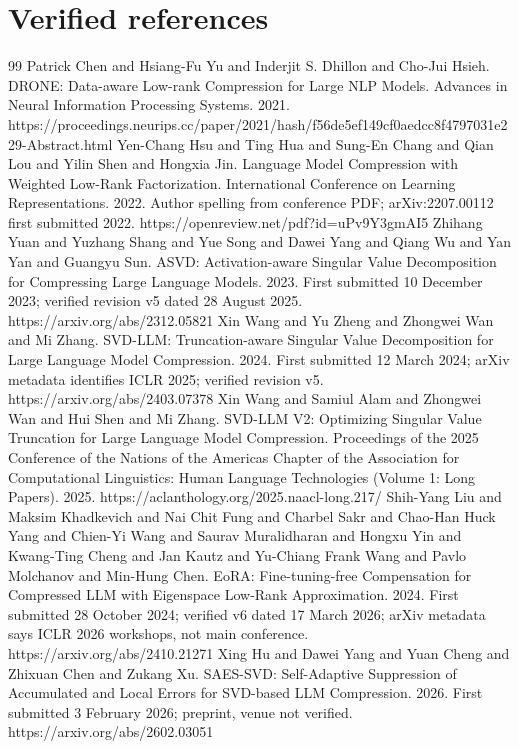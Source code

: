 \documentclass[10pt]{article}
\begin{document}
\section{Verified references}
\begin{thebibliography}{99}
 Patrick Chen and Hsiang-Fu Yu and Inderjit S. Dhillon and Cho-Jui Hsieh. DRONE: Data-aware Low-rank Compression for Large NLP Models. Advances in Neural Information Processing Systems. 2021. https://proceedings.neurips.cc/paper/2021/hash/f56de5ef149cf0aedcc8f4797031e229-Abstract.html
 Yen-Chang Hsu and Ting Hua and Sung-En Chang and Qian Lou and Yilin Shen and Hongxia Jin. Language Model Compression with Weighted Low-Rank Factorization. International Conference on Learning Representations. 2022. Author spelling from conference PDF; arXiv:2207.00112 first submitted 2022. https://openreview.net/pdf?id=uPv9Y3gmAI5
 Zhihang Yuan and Yuzhang Shang and Yue Song and Dawei Yang and Qiang Wu and Yan Yan and Guangyu Sun. ASVD: Activation-aware Singular Value Decomposition for Compressing Large Language Models. 2023. First submitted 10 December 2023; verified revision v5 dated 28 August 2025. https://arxiv.org/abs/2312.05821
 Xin Wang and Yu Zheng and Zhongwei Wan and Mi Zhang. SVD-LLM: Truncation-aware Singular Value Decomposition for Large Language Model Compression. 2024. First submitted 12 March 2024; arXiv metadata identifies ICLR 2025; verified revision v5. https://arxiv.org/abs/2403.07378
 Xin Wang and Samiul Alam and Zhongwei Wan and Hui Shen and Mi Zhang. SVD-LLM V2: Optimizing Singular Value Truncation for Large Language Model Compression. Proceedings of the 2025 Conference of the Nations of the Americas Chapter of the Association for Computational Linguistics: Human Language Technologies (Volume 1: Long Papers). 2025. https://aclanthology.org/2025.naacl-long.217/
 Shih-Yang Liu and Maksim Khadkevich and Nai Chit Fung and Charbel Sakr and Chao-Han Huck Yang and Chien-Yi Wang and Saurav Muralidharan and Hongxu Yin and Kwang-Ting Cheng and Jan Kautz and Yu-Chiang Frank Wang and Pavlo Molchanov and Min-Hung Chen. EoRA: Fine-tuning-free Compensation for Compressed LLM with Eigenspace Low-Rank Approximation. 2024. First submitted 28 October 2024; verified v6 dated 17 March 2026; arXiv metadata says ICLR 2026 workshops, not main conference. https://arxiv.org/abs/2410.21271
 Xing Hu and Dawei Yang and Yuan Cheng and Zhixuan Chen and Zukang Xu. SAES-SVD: Self-Adaptive Suppression of Accumulated and Local Errors for SVD-based LLM Compression. 2026. First submitted 3 February 2026; preprint, venue not verified. https://arxiv.org/abs/2602.03051

\end{thebibliography}
\end{document}
